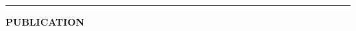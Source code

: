 \documentclass[letterpaper, 11pt]{article}
\begin{document}
\begin{center}
\noindent\rule{0.75\textwidth}{1pt}
\end{center}

\begin{center}
\large\bf{PUBLICATION}
\end{center}

\nocite{*}

\printbibliography[title=\normalsize Master Thesis]

\end{document}
